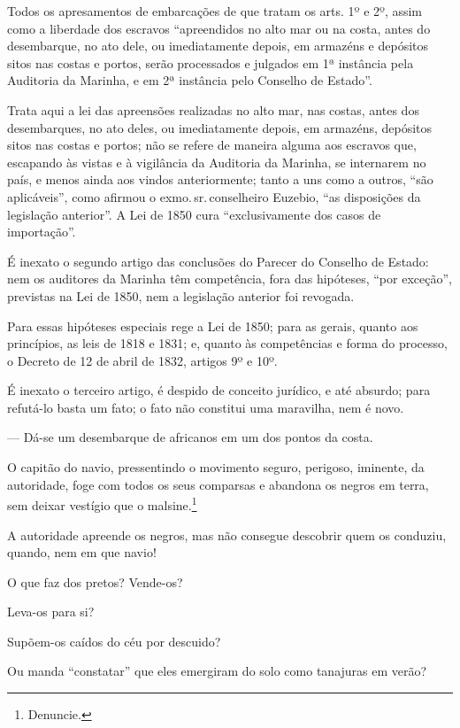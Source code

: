 {Todos os apresamentos de embarcações de que tratam os arts. 1º e 2º,
assim como a liberdade dos escravos ``apreendidos no alto mar ou na
costa, antes do desembarque, no ato dele, ou imediatamente depois, em
armazéns e depósitos sitos nas costas e portos, serão processados e
julgados em 1ª instância pela Auditoria da Marinha, e em 2ª
instância pelo Conselho de Estado''.

Trata aqui a lei das apreensões realizadas no alto mar, nas costas,
antes dos desembarques, no ato deles, ou imediatamente depois, em
armazéns, depósitos sitos nas costas e portos; não se refere de maneira
alguma aos escravos que, escapando às vistas e à vigilância da Auditoria
da Marinha, se internarem no país, e menos ainda aos vindos
anteriormente; tanto a uns como a outros, ``são aplicáveis'', como afirmou
o exmo.\,sr.\,conselheiro Euzebio, ``as disposições da legislação
anterior''. A Lei de 1850 cura ``exclusivamente dos casos de importação''.

É inexato o segundo artigo das conclusões do Parecer do Conselho de
Estado: nem os auditores da Marinha têm competência, fora das hipóteses,
``por exceção'', previstas na Lei de 1850, nem a legislação anterior foi
revogada.

Para essas hipóteses especiais rege a Lei de 1850; para as gerais,
quanto aos princípios, as leis de 1818 e 1831; e, quanto às competências
e forma do processo, o Decreto de 12 de abril de 1832, artigos 9º
e 10º.

É inexato o terceiro artigo, é despido de conceito jurídico, e até
absurdo; para refutá-lo basta um fato; o fato não constitui uma
maravilha, nem é novo.

--- Dá-se um desembarque de africanos em um dos pontos da costa.

O capitão do navio, pressentindo o movimento seguro, perigoso, iminente,
da autoridade, foge com todos os seus comparsas e abandona os negros em
terra, sem deixar vestígio que o malsine.\footnote{Denuncie.}

A autoridade apreende os negros, mas não consegue descobrir quem os
conduziu, quando, nem em que navio!

O que faz dos pretos? Vende-os?

Leva-os para si?

Supõem-os caídos do céu por descuido?

Ou manda ``constatar'' que eles emergiram do solo como tanajuras em verão?

}
